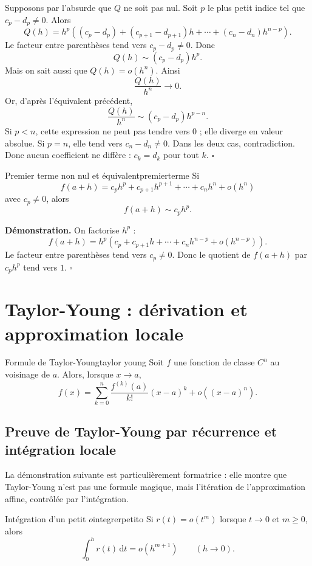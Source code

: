 \documentclass[11pt,a4paper]{article}
\newcommand{\dd}{\mathrm{d}}
\begin{document}
Supposons par l'absurde que $Q$ ne soit pas nul. Soit $p$ le plus petit indice tel que $c_p-d_p\ne0$. Alors
\[
  Q(h)=h^p\left((c_p-d_p)+(c_{p+1}-d_{p+1})h+\cdots+(c_n-d_n)h^{n-p}\right).
\]
Le facteur entre parenthèses tend vers $c_p-d_p\ne0$. Donc
\[
  Q(h)\sim (c_p-d_p)h^p.
\]
Mais on sait aussi que $Q(h)=o(h^n)$. Ainsi
\[
  \frac{Q(h)}{h^n}\to0.
\]
Or, d'après l'équivalent précédent,
\[
  \frac{Q(h)}{h^n}\sim (c_p-d_p)h^{p-n}.
\]
Si $p<n$, cette expression ne peut pas tendre vers $0$ ; elle diverge en valeur absolue. Si $p=n$, elle tend vers $c_n-d_n\ne0$. Dans les deux cas, contradiction. Donc aucun coefficient ne diffère : $c_k=d_k$ pour tout $k$.
\hfill $\square$

\begin{propositionbox}{Premier terme non nul et équivalent}{premierterme}
Si
\[
  f(a+h)=c_p h^p+c_{p+1}h^{p+1}+\cdots+c_nh^n+o(h^n)
\]
avec $c_p\ne0$, alors
\[
  f(a+h)\sim c_p h^p.
\]
\end{propositionbox}

\textbf{Démonstration.} On factorise $h^p$ :
\[
  f(a+h)=h^p\left(c_p+c_{p+1}h+\cdots+c_nh^{n-p}+o(h^{n-p})\right).
\]
Le facteur entre parenthèses tend vers $c_p\ne0$. Donc le quotient de $f(a+h)$ par $c_p h^p$ tend vers $1$.
\hfill $\square$

\section{Taylor-Young : dérivation et approximation locale}

\begin{theorembox}{Formule de Taylor-Young}{taylor young}
Soit $f$ une fonction de classe $C^n$ au voisinage de $a$. Alors, lorsque $x\to a$,
\[
  f(x)=\sum_{k=0}^n \frac{f^{(k)}(a)}{k!}(x-a)^k+o((x-a)^n).
\]
\end{theorembox}

\subsection{Preuve de Taylor-Young par récurrence et intégration locale}

La démonstration suivante est particulièrement formatrice : elle montre que Taylor-Young n'est pas une formule magique, mais l'itération de l'approximation affine, contrôlée par l'intégration.

\begin{lemmabox}{Intégration d'un petit $o$}{integrerpetito}
Si $r(t)=o(t^m)$ lorsque $t\to0$ et $m\ge0$, alors
\[
  \int_0^h r(t)\,\dd t=o(h^{m+1})\qquad(h\to0).
\]
\end{lemmabox}
\end{document}
